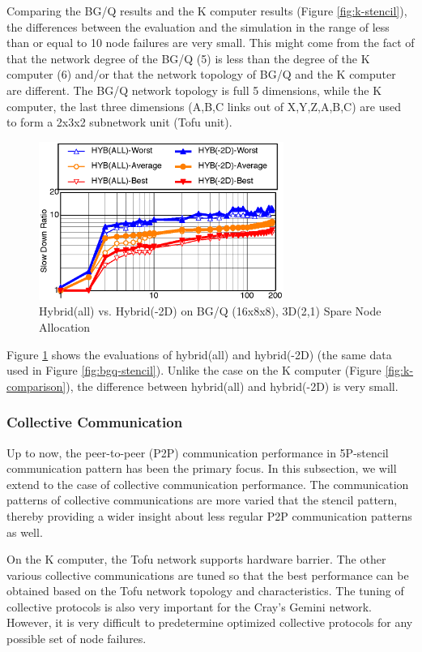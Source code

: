 \documentclass[Afour,times,sagev]{sagej}
\begin{document}
Comparing the BG/Q results and the K computer results (Figure
\ref{fig:k-stencil}), the differences between the evaluation and the
simulation in the range of less than or equal to 10 node failures are
very small. This might come from the fact of that the network degree
of the BG/Q (5) is less than the degree of the K computer (6) and/or
that the network topology of BG/Q and the K computer are different.
The BG/Q network topology is full 5 dimensions, while the K computer,
the last three dimensions (A,B,C links out of X,Y,Z,A,B,C) are used to
form a 2x3x2 subnetwork unit (Tofu unit).

\begin{figure}[ht]
\centering
\includegraphics[width=80mm]{Figs/BGQ-comparison-CL.eps}
  \caption{Hybrid(all) vs. Hybrid(-2D) on BG/Q (16x8x8), 3D(2,1) Spare
    Node Allocation}
  \label{fig:bgq-comparison}
\end{figure}

Figure \ref{fig:bgq-comparison} shows the evaluations of hybrid(all)
and hybrid(-2D) (the same data used in Figure
\ref{fig:bgq-stencil}). Unlike the case on the K computer (Figure
\ref{fig:k-comparison}), the difference between hybrid(all) and
hybrid(-2D) is very small.

\subsubsection{Collective Communication}

Up to now, the peer-to-peer (P2P) communication performance in
5P-stencil communication pattern has been the primary focus. In this
subsection, we will extend to the case of collective communication
performance.
The communication patterns of collective communications are more
varied that the stencil pattern, thereby providing a wider insight
about less regular P2P communication patterns as well.

On the K computer, the Tofu network supports hardware barrier. The
other various collective communications are tuned so that the best
performance can be obtained based on the Tofu network topology and
characteristics\cite{sumimoto-k}. The tuning of collective protocols
is also very important for the Cray's Gemini
network\cite{Pena:2013:ATM:2488551.2488564}. However, it is very
difficult to predetermine optimized collective protocols for any
possible set of node failures.
\end{document}

